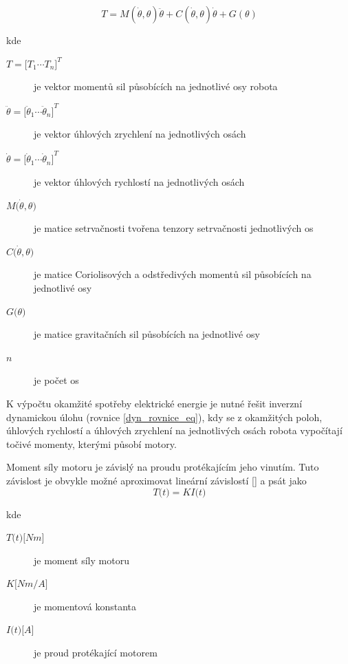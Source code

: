 \begin{equation}
T = M(\dot{\theta},\theta)\ddot{\theta} + C(\dot{\theta},\theta)\dot{\theta} + G(\theta)
\label{dyn_rovnice_eq}
\end{equation}

kde

\begin{description}
\item[$T = {\big[T_1  \dotsm  T_n\big]}^{T}$] je vektor momentů sil působících na jednotlivé osy robota
\item[$\ddot \theta = {\big[\ddot \theta_1  \dotsm  \ddot \theta_n\big]}^{T}$] je vektor úhlových zrychlení na jednotlivých osách
\item[$\dot \theta = {\big[\dot \theta_1  \dotsm  \dot \theta_n\big]}^{T}$] je vektor úhlových rychlostí na jednotlivých osách
\item[$M\big(\dot \theta, \theta\big)$] je matice setrvačnosti tvořena tenzory setrvačnosti jednotlivých os
\item[$C\big(\dot \theta, \theta\big)$] je matice Coriolisových a odstředivých momentů sil působících na jednotlivé osy
\item[$G\big(\theta\big)$] je matice gravitačních sil působících na jednotlivé osy
\item[$n$] je počet os
\end{description}

K výpočtu okamžité spotřeby elektrické energie je nutné řešit inverzní dynamickou úlohu (rovnice \ref{dyn_rovnice_eq}), kdy se z okamžitých poloh, úhlových rychlostí a úhlových zrychlení na jednotlivých osách robota vypočítají točivé momenty, kterými působí motory. 

Moment síly motoru je závislý na proudu protékajícím jeho vinutím. Tuto závislost je obvykle možné aproximovat lineární závislostí [\cite{sbornik}] a psát jako
\begin{equation}
T\big(t\big) = KI\big(t\big)
\label{torque_current_eq}
\end{equation}

kde

\begin{description}
\item[$T\big(t\big) {\big[Nm\big]}$] je moment síly motoru 
\item[$K {\big[Nm/A\big]}$] je momentová konstanta 
\item[$I\big(t\big) {\big[A\big]}$] je proud protékající motorem 
\end{description}

